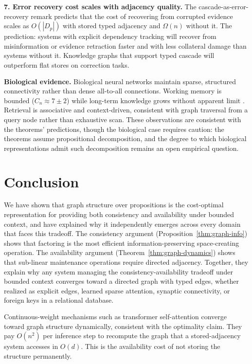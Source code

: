 \documentclass[11pt]{article}
\theoremstyle{definition}
\begin{document}
\textbf{7. Error recovery cost scales with adjacency quality.}
The cascade-as-error-recovery remark predicts that the cost of
recovering from corrupted evidence scales as $O(|D_p|)$ with stored
typed adjacency and $\Omega(n)$ without it. The prediction: systems
with explicit dependency tracking will recover from misinformation or
evidence retraction faster and with less collateral damage than systems
without it. Knowledge graphs that support typed cascade will outperform
flat stores on correction tasks.

\textbf{Biological evidence.}
Biological neural networks maintain sparse, structured connectivity
rather than dense all-to-all connections. Working memory is bounded
($C_n \approx 7 \pm 2$) while long-term knowledge grows without
apparent limit \cite{Miller1956}. Retrieval is associative and
context-driven, consistent with graph traversal from a query node
rather than exhaustive scan. These observations are consistent with
the theorems' predictions, though the biological case requires
caution: the theorems assume propositional decomposition, and the
degree to which biological representations admit such decomposition
remains an open empirical question.

\section{Conclusion}
\label{sec:conclusion}

We have shown that graph structure over propositions is the cost-optimal
representation for providing both consistency and availability under
bounded context, and have explained why it independently emerges across
every domain that faces this tradeoff. The consistency argument
(Proposition~\ref{thm:graph-info}) shows that factoring is the most efficient
information-preserving space-creating operation. The availability
argument (Theorem~\ref{thm:graph-dynamics}) shows that sub-linear
maintenance operations require directed adjacency. Together, they
explain why any system managing the consistency-availability
tradeoff under bounded context converges toward a directed graph
with typed edges, whether realized as explicit edges, learned sparse
attention, synaptic connectivity, or foreign keys in a relational
database.

Continuous-weight mechanisms such as transformer self-attention
converge toward graph structure dynamically, consistent with the
optimality claim. They pay $O(n^2)$ per inference step to
recompute the graph that a stored-adjacency system accesses in $O(d)$.
This is the availability cost of not storing the structure permanently.
\end{document}
